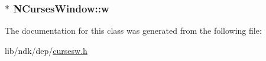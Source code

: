 \hypertarget{class_n_curses_window_a72826363344950e11235001ee68a6228}{
\subsubsection[{w}]{$\ast$ N\-Curses\-Window\-::w\hspace{0.3cm}{\ttfamily [protected]}}}\label{class_n_curses_window_a72826363344950e11235001ee68a6228}


The documentation for this class was generated from the following file\-:\begin{DoxyCompactItemize}
\item 
lib/ndk/dep/\hyperlink{cursesw_8h}{cursesw.\-h}\end{DoxyCompactItemize}
